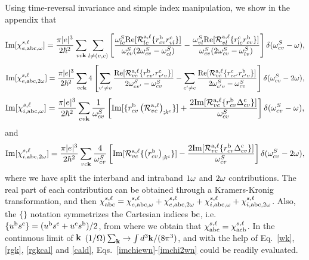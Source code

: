 \documentclass[floatfix,prb,aps,superscriptaddress,11pt,preprint]{revtex4}
\begin{document}
Using time-reversal invariance and simple index manipulation, we show
in the appendix that

\begin{equation}\label{imchiewn}
\mathrm{Im}[\chi_{e,\mathrm{a}\mathrm{b}\mathrm{c},\omega}^{s,\ell}]
=
\frac{\pi |e|^3}{2\hbar^2} 
\sum_{vc\mathbf{k}}
\sum_{l\neq(v,c)}
\left[
\frac{\omega^S_{lc}\mathrm{Re}[{\cal R}^{\mathrm{a},\ell}_{lc}\{r^{\mathrm{b}}_{cv}r^{\mathrm{c}}_{vl}\}]}
{\omega^S_{cv}(2\omega^S_{cv}-\omega^S_{cl})}
-
\frac{\omega^S_{vl}\mathrm{Re}[{\cal R}^{\mathrm{a},\ell}_{vl}\{r^{\mathrm{c}}_{lc}r^{\mathrm{b}}_{cv}\}]}
{\omega^S_{cv}(2\omega^S_{cv}-\omega^S_{lv})}
\right]
\delta(\omega^S_{cv}-\omega)
,
\end{equation}  
\begin{equation}\label{imchie2wn}
\mathrm{Im}[\chi_{e,\mathrm{a}\mathrm{b}\mathrm{c},2\omega}^{s,\ell}]
=
\frac{\pi |e|^3}{2\hbar^2} 
\sum_{vc\mathbf{k}}
4
\left[
\sum_{v'\ne v}
\frac{\mathrm{Re}[{\cal
    R}^{\mathrm{a},\ell}_{vc}\{r^{\mathrm{b}}_{cv'}r^{\mathrm{c}}_{v'v}\}]}{2\omega^S_{cv'}-\omega^S_{cv}}
-
\sum_{c'\ne c}
\frac{\mathrm{Re}[{\cal R}^{\mathrm{a},\ell}_{vc}\{r^{\mathrm{c}}_{cc'}r^{\mathrm{b}}_{c'v}\}]}
{2\omega^S_{c'v}-\omega^S_{cv}}
\right]
\delta(\omega^S_{cv}-2\omega)
,
\end{equation}
\begin{equation}\label{imchiwn}
\mathrm{Im}[\chi_{i,\mathrm{a}\mathrm{b}\mathrm{c},\omega}^{s,\ell}]
=
\frac{\pi|e|^3}{2\hbar^2}
\sum_{cv\mathbf{k}}
\frac{1}{\omega^S_{cv}}
\left[
\mathrm{Im}[\{r^{\mathrm{b}}_{cv}\left({\cal R}^{\mathrm{a},\ell}_{vc}\right)_{;k^{\mathrm{c}}}\}]
+
\frac{2\mathrm{Im}[{\cal R}^{\mathrm{a},\ell}_{vc}\{r^{\mathrm{b}}_{cv}\Delta^{\mathrm{c}}_{cv}\}]}{\omega^S_{cv}}
\right]
\delta(\omega^S_{cv}-\omega)
,
\end{equation}
and
\begin{equation}\label{imchi2wn}
\mathrm{Im}[\chi_{i,\mathrm{a}\mathrm{b}\mathrm{c},2\omega}^{s,\ell}]
=
\frac{\pi|e|^3}{2\hbar^2}\sum_{vc\mathbf{k}}
\frac{4}{\omega^S_{cv}}
\left[
\mathrm{Im}[{\cal R}^{\mathrm{a},\ell}_{vc}\{\left(r^{\mathrm{b}}_{cv}\right)_{;k^{\mathrm{c}}}\}]
-
\frac{2\mathrm{Im}[{\cal R}^{\mathrm{a},\ell}_{vc}\{r^{\mathrm{b}}_{cv}\Delta^{\mathrm{c}}_{cv}\}]}{\omega^S_{cv}}
\right]\delta(\omega^S_{cv}-2\omega)
,
\end{equation}
where we have split the interband and intraband $1\omega$ and $2\omega$
contributions. The real part of each contribution can be obtained through
a Kramers-Kronig transformation, and then
$\chi^{s,\ell}_{\mathrm{a}\mathrm{b}\mathrm{c}}=\chi^{s,\ell}_{e,\mathrm{a}\mathrm{b}\mathrm{c},\omega}+\chi^{s,\ell}_{e,\mathrm{a}\mathrm{b}\mathrm{c},2\omega}+\chi^{s,\ell}_{i,\mathrm{a}\mathrm{b}\mathrm{c},\omega}+\chi^{s,\ell}_{i,\mathrm{a}\mathrm{b}\mathrm{c},2\omega}
$. Also,
the
$\{\}$ notation symmetrizes the Cartesian indices $\mathrm{b}\mathrm{c}$, i.e. 
$\{u^{\mathrm{b}}s^{\mathrm{c}}\}=(u^{\mathrm{b}}s^{\mathrm{c}}+u^{\mathrm{c}}s^{\mathrm{b}})/2$,
from where we obtain that
$\chi_{\mathrm{a}\mathrm{b}\mathrm{c}}^{s,\ell}=\chi_{\mathrm{a}\mathrm{c}\mathrm{b}}^{s,\ell}$.
In the continuous limit of $\mathbf{k}$ 
$(1/\Omega)\sum_{\mathbf{k}}\to\int d^3\mathbf{k}/(8\pi^3)$, and with the help of 
Eq.~\eqref{wk}, \eqref{rgk}, \eqref{rgkcal} and \eqref{cald}, 
Eqs.~\eqref{imchiewn}-\eqref{imchi2wn} could be
readily evaluated.
\end{document}
